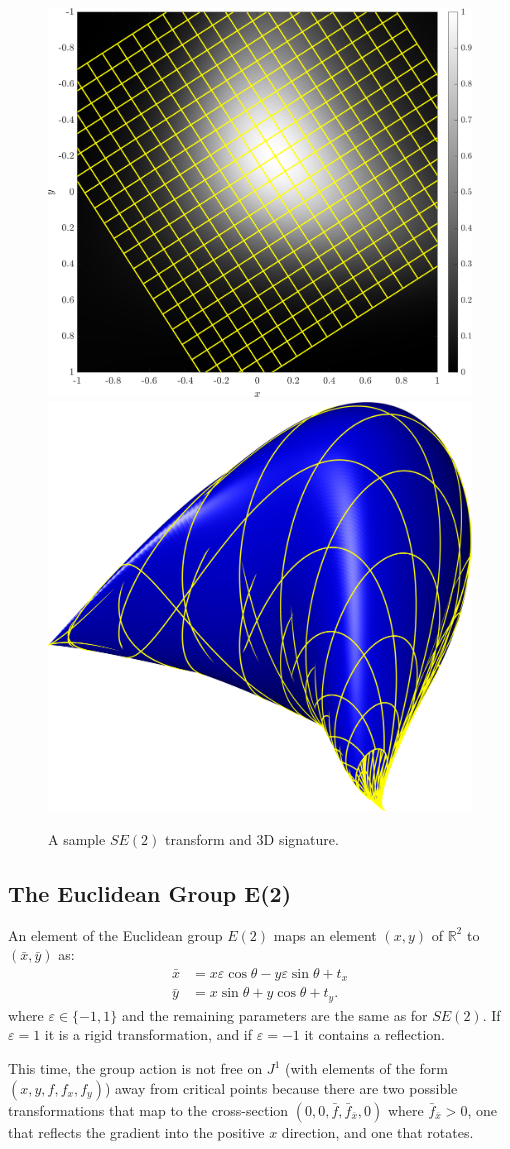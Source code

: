 \documentclass{artjlt}
\begin{document}
\begin{figure}
\centering
\includegraphics[width=.45\textwidth]{Figs/f_transformed_SE2.png}
\includegraphics[width=.45\textwidth]{Figs/SE2_signature.png}
\caption{A sample $SE(2)$ transform and 3D signature.}
\label{fig:SE2}
\end{figure}

\subsection{The Euclidean Group E(2)}
An element of the Euclidean group $E(2)$ maps an element $(x, y)$ of
$\mathbb{R}^2$ to $(\bar{x}, \bar{y})$ as:
\begin{equation*}
  \begin{aligned}
    \bar{x} &=  x\varepsilon\cos\theta  - y\varepsilon\sin\theta + t_x \\
    \bar{y} &= x\sin\theta  + y\cos\theta + t_y.
  \end{aligned}
\end{equation*}
where $\varepsilon \in \{-1, 1\}$ and the remaining parameters are the same
as for $SE(2)$. If $\varepsilon = 1$ it is a rigid transformation, and if
$\varepsilon = -1$ it contains a reflection.

This time, the group action is not free on $J^1$ (with elements of the form
$(x, y, f, f_x, f_y)$) away from critical points because there are two
possible transformations that map to the cross-section $(0, 0, \bar{f},
\bar{f}_{\bar{x}}, 0)$ where $\bar{f}_{\bar{x}} > 0$, one that reflects the
gradient into the positive $x$ direction, and one that rotates. 
\end{document}
